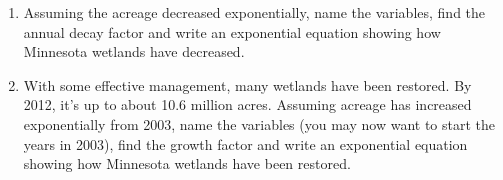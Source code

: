 \begin{enumerate}
 \begin{enumerate}
\item Assuming the acreage decreased exponentially, name the variables, find the annual decay factor and  write an exponential equation showing how Minnesota wetlands have decreased.
\item With some effective management, many wetlands have been restored.  By 2012, it's up to about 10.6 million acres.  Assuming acreage has increased exponentially from 2003, name the variables (you may now want to start the years in 2003), find the growth factor and write an exponential equation showing how Minnesota wetlands have been restored.   
\end{enumerate}

\end{enumerate}

